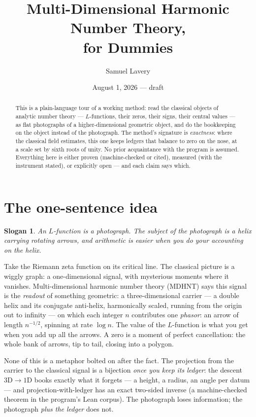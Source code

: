 \documentclass[11pt]{article}
\title{Multi-Dimensional Harmonic Number Theory,\\ for Dummies}
\author{Samuel Lavery}
\date{August 1, 2026 --- draft}
\newtheorem*{slogan}{Slogan}
\begin{document}
\maketitle

\begin{abstract}
This is a plain-language tour of a working method: read the classical objects of
analytic number theory --- $L$-functions, their zeros, their signs, their central
values --- as flat photographs of a higher-dimensional geometric object, and do the
bookkeeping on the object instead of the photograph.  The method's signature is
\emph{exactness}: where the classical field estimates, this one keeps ledgers that
balance to zero on the nose, at a scale set by sixth roots of unity.  No prior
acquaintance with the program is assumed.  Everything here is either proven
(machine-checked or cited), measured (with the instrument stated), or explicitly
open --- and each claim says which.
\end{abstract}

\section{The one-sentence idea}

\begin{slogan}
An $L$-function is a photograph.  The subject of the photograph is a helix carrying
rotating arrows, and arithmetic is easier when you do your accounting on the helix.
\end{slogan}

Take the Riemann zeta function on its critical line.  The classical picture is a
wiggly graph: a one-dimensional signal, with mysterious moments where it vanishes.
Multi-dimensional harmonic number theory (MDHNT) says this signal is the
\emph{readout} of something geometric: a three-dimensional carrier --- a double
helix and its conjugate anti-helix, harmonically scaled, running from the origin
out to infinity --- on which each integer $n$ contributes one \emph{phasor}: an
arrow of length $n^{-1/2}$, spinning at rate $\log n$.  The value of the
$L$-function is what you get when you add up all the arrows.  A zero is a moment
of perfect cancellation: the whole bank of arrows, tip to tail, closing into a
polygon.

None of this is a metaphor bolted on after the fact.  The projection from the
carrier to the classical signal is a bijection \emph{once you keep its ledger}: the
descent $3\mathrm D\to1\mathrm D$ books exactly what it forgets --- a height, a
radius, an angle per datum --- and projection-with-ledger has an exact two-sided
inverse (a machine-checked theorem in the program's Lean corpus).  The photograph
loses information; the photograph \emph{plus the ledger} does not.
\end{document}
